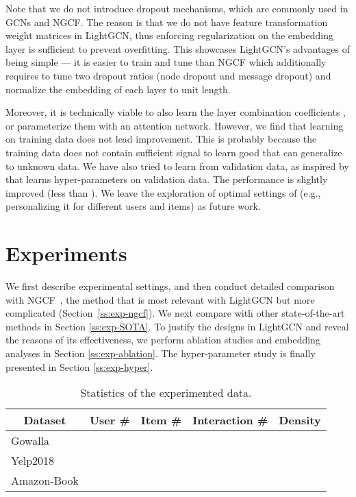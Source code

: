\documentclass[sigconf]{acmart}
\theoremstyle{definition}
\begin{document}
Note that we do not introduce dropout mechanisms, which are commonly used in GCNs and NGCF. The reason is that we do not have feature transformation weight matrices in LightGCN, thus enforcing  regularization on the embedding layer is sufficient to prevent overfitting. 
This showcases LightGCN's advantages of being simple --- it is easier to train and tune than NGCF which additionally requires to tune two dropout ratios (node dropout and message dropout) and normalize the embedding of each layer to unit length. 

Moreover, it is technically viable to also learn the layer combination coefficients , or parameterize them with an attention network. However, we find that learning  on training data does not lead improvement. This is probably because the training data does not contain sufficient signal to learn good  that can generalize to unknown data. We have also tried to learn  from validation data, as inspired by \cite{lambdaOpt} that learns hyper-parameters on validation data. The performance is slightly improved (less than ). We leave the exploration of optimal settings of  (e.g., personalizing it for different users and items) as future work.  \section{Experiments}\label{sec:experiments}
We first describe experimental settings, and then conduct detailed comparison with NGCF~\cite{NGCF}, the method that is most relevant with LightGCN but more complicated (Section~\ref{ss:exp-ngcf}). We next compare with other state-of-the-art methods in Section \ref{ss:exp-SOTA}. To justify the designs in LightGCN and reveal the reasons of its effectiveness, we perform ablation studies and embedding analyses in Section \ref{ss:exp-ablation}. The hyper-parameter study is finally presented in Section \ref{ss:exp-hyper}. 

\begin{table}[t]
\caption{Statistics of the experimented data.}
\vspace{-10px}
\label{tab:dataset}
\begin{tabular}{l|r|r|r|r}
\hline
\multicolumn{1}{c|}{\textbf{Dataset}} & \multicolumn{1}{c|}{\textbf{User \#}} & \multicolumn{1}{c|}{\textbf{Item \#}} & \multicolumn{1}{c|}{\textbf{Interaction \#}} & \multicolumn{1}{c}{\textbf{Density}} \\ \hline\hline
Gowalla &  &  &  &  \\ \hline
Yelp2018 &  &  &  &  \\ \hline
Amazon-Book &  &  &  &  \\ \hline
\end{tabular}
\vspace{-15px}
\end{table}
\end{document}
